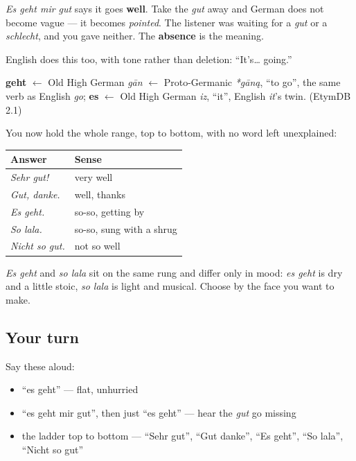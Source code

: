 \emph{Es geht mir gut} says it goes \textbf{well}. Take the \emph{gut} away and German does not become vague — it becomes \emph{pointed}. The listener was waiting for a \emph{gut} or a \emph{schlecht}, and you gave neither. The \textbf{absence} is the meaning.

English does this too, with tone rather than deletion: \textquotedblleft{}It's… going.\textquotedblright{}

\begin{cousinweb}
\textbf{geht} $\leftarrow$ Old High German \emph{gān} $\leftarrow$ Proto-Germanic \emph{*gāną}, \textquotedblleft{}to go\textquotedblright{}, the same verb as English \emph{go}; \textbf{es} $\leftarrow$ Old High German \emph{iz}, \textquotedblleft{}it\textquotedblright{}, English \emph{it}'s twin. (EtymDB 2.1)
\end{cousinweb}

\begin{grammarlens}[title={Grammar Lens: the answer ladder}]
You now hold the whole range, top to bottom, with no word left unexplained:

\noindent
\begin{tabularx}{\linewidth}{@{}>{\raggedright\arraybackslash}X>{\raggedright\arraybackslash}X@{}}
\toprule
\textbf{Answer} & \textbf{Sense} \\
\midrule
\emph{Sehr gut!} & very well \\
\emph{Gut, danke.} & well, thanks \\
\emph{Es geht.} & so-so, getting by \\
\emph{So lala.} & so-so, sung with a shrug \\
\emph{Nicht so gut.} & not so well \\
\bottomrule
\end{tabularx}

\emph{Es geht} and \emph{so lala} sit on the same rung and differ only in mood: \emph{es geht} is dry and a little stoic, \emph{so lala} is light and musical. Choose by the face you want to make.
\end{grammarlens}

\subsection*{Your turn}
Say these aloud:

\begin{itemize}
\raggedright
  \item \textquotedblleft{}es geht\textquotedblright{} — flat, unhurried
  \item \textquotedblleft{}es geht mir gut\textquotedblright{}, then just \textquotedblleft{}es geht\textquotedblright{} — hear the \emph{gut} go missing
  \item the ladder top to bottom — \textquotedblleft{}Sehr gut\textquotedblright{}, \textquotedblleft{}Gut danke\textquotedblright{}, \textquotedblleft{}Es geht\textquotedblright{}, \textquotedblleft{}So lala\textquotedblright{}, \textquotedblleft{}Nicht so gut\textquotedblright{}
\end{itemize}

